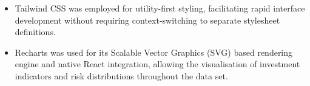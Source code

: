 \begin{itemize}
    \item Tailwind CSS \parencite{TailwindLabs2021} was employed for utility-first styling, facilitating rapid interface development without requiring context-switching to separate stylesheet definitions.
    
    \item Recharts \parencite{recharts2026} was used for its Scalable Vector Graphics (SVG) based rendering engine and native React integration, allowing the visualisation of investment indicators and risk distributions throughout the data set.
    
\end{itemize}



